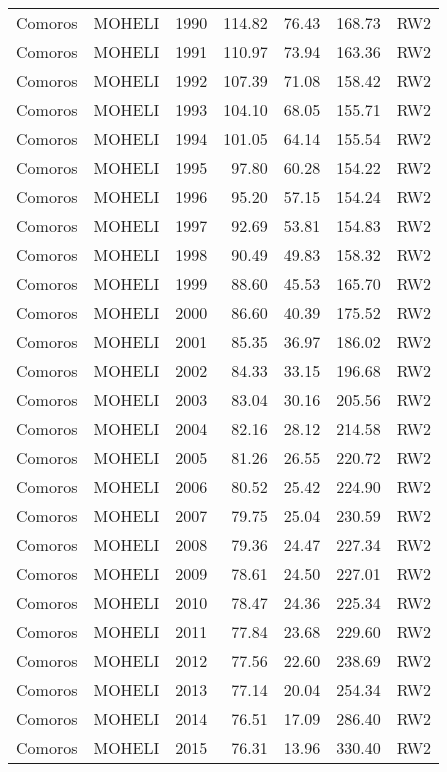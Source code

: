\begin{longtable}{lllrrrl}
  Comoros & MOHELI & 1990 & 114.82 & 76.43 & 168.73 & RW2 \\ 
  Comoros & MOHELI & 1991 & 110.97 & 73.94 & 163.36 & RW2 \\ 
  Comoros & MOHELI & 1992 & 107.39 & 71.08 & 158.42 & RW2 \\ 
  Comoros & MOHELI & 1993 & 104.10 & 68.05 & 155.71 & RW2 \\ 
  Comoros & MOHELI & 1994 & 101.05 & 64.14 & 155.54 & RW2 \\ 
  Comoros & MOHELI & 1995 & 97.80 & 60.28 & 154.22 & RW2 \\ 
  Comoros & MOHELI & 1996 & 95.20 & 57.15 & 154.24 & RW2 \\ 
  Comoros & MOHELI & 1997 & 92.69 & 53.81 & 154.83 & RW2 \\ 
  Comoros & MOHELI & 1998 & 90.49 & 49.83 & 158.32 & RW2 \\ 
  Comoros & MOHELI & 1999 & 88.60 & 45.53 & 165.70 & RW2 \\ 
  Comoros & MOHELI & 2000 & 86.60 & 40.39 & 175.52 & RW2 \\ 
  Comoros & MOHELI & 2001 & 85.35 & 36.97 & 186.02 & RW2 \\ 
  Comoros & MOHELI & 2002 & 84.33 & 33.15 & 196.68 & RW2 \\ 
  Comoros & MOHELI & 2003 & 83.04 & 30.16 & 205.56 & RW2 \\ 
  Comoros & MOHELI & 2004 & 82.16 & 28.12 & 214.58 & RW2 \\ 
  Comoros & MOHELI & 2005 & 81.26 & 26.55 & 220.72 & RW2 \\ 
  Comoros & MOHELI & 2006 & 80.52 & 25.42 & 224.90 & RW2 \\ 
  Comoros & MOHELI & 2007 & 79.75 & 25.04 & 230.59 & RW2 \\ 
  Comoros & MOHELI & 2008 & 79.36 & 24.47 & 227.34 & RW2 \\ 
  Comoros & MOHELI & 2009 & 78.61 & 24.50 & 227.01 & RW2 \\ 
  Comoros & MOHELI & 2010 & 78.47 & 24.36 & 225.34 & RW2 \\ 
  Comoros & MOHELI & 2011 & 77.84 & 23.68 & 229.60 & RW2 \\ 
  Comoros & MOHELI & 2012 & 77.56 & 22.60 & 238.69 & RW2 \\ 
  Comoros & MOHELI & 2013 & 77.14 & 20.04 & 254.34 & RW2 \\ 
  Comoros & MOHELI & 2014 & 76.51 & 17.09 & 286.40 & RW2 \\ 
  Comoros & MOHELI & 2015 & 76.31 & 13.96 & 330.40 & RW2 \\ 

\end{longtable}
